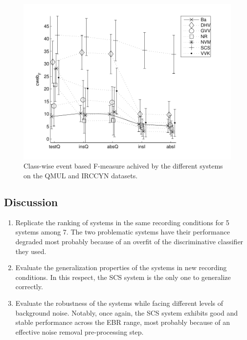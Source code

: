 \begin{figure}[t]
\includegraphics[width=1\textwidth]{gfxML/irccyn}
\caption{ Class-wise event based F-measure achived by the different systems on the QMUL and IRCCYN datasets.}
\label{fig:irccyn}
\end{figure}

\subsection{Discussion}


\begin{enumerate}
\item Replicate the ranking of systems in the same recording conditions for 5 systems among 7. The two problematic systems have their performance degraded most probably because of an overfit of the discriminative classifier they used.
\item Evaluate the generalization properties of the systems in new recording conditions. In this respect, the SCS system is the only one to generalize correctly.
\item Evaluate the robustness of the systems while facing different levels of background noise. Notably, once again, the SCS system exhibits good and stable performance across the EBR range, most probably because of an effective noise removal pre-processing step.
\end{enumerate}


